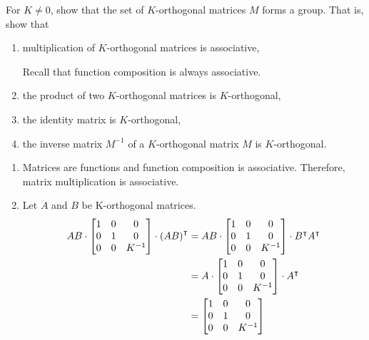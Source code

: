\documentclass[newpage,hints,handout,noauthor,nooutcomes,12pt]{ximera}
\begin{document}
\begin{problem}
For $K\neq0$, show that the set of $K$-orthogonal matrices $M$ forms a
group.  That is, show that
\begin{enumerate}
\item multiplication of $K$-orthogonal matrices is associative, 
	\begin{hint}
	Recall that function composition is always associative.
	\end{hint}
\item the product of two $K$-orthogonal matrices is $K$-orthogonal,
\item the identity matrix is $K$-orthogonal,
\item the inverse matrix $M^{-1}$ of a $K$-orthogonal matrix $M$ is $K$-orthogonal.
\end{enumerate}

\begin{freeResponse}
\begin{enumerate}
\item Matrices are functions and function composition is associative. Therefore, matrix multiplication is associative.

\item Let $A$ and $B$ be K-orthogonal matrices. 
\begin{align*}
AB \cdot \begin{bmatrix}
1 & 0 & 0\\
0 & 1 & 0\\
0 & 0 & K^{-1}%
\end{bmatrix} \cdot
\left(AB\right)^\transpose
&= AB \cdot \begin{bmatrix}
1 & 0 & 0\\
0 & 1 & 0\\
0 & 0 & K^{-1}%
\end{bmatrix} \cdot
B^\transpose A^\transpose \\
&=A \cdot \begin{bmatrix}
1 & 0 & 0\\
0 & 1 & 0\\
0 & 0 & K^{-1}%
\end{bmatrix} \cdot
A^\transpose \\
&= \begin{bmatrix}
1 & 0 & 0\\
0 & 1 & 0\\
0 & 0 & K^{-1}%
\end{bmatrix}
\end{align*}


\end{enumerate}
\end{freeResponse}
\end{problem}
\end{document}
